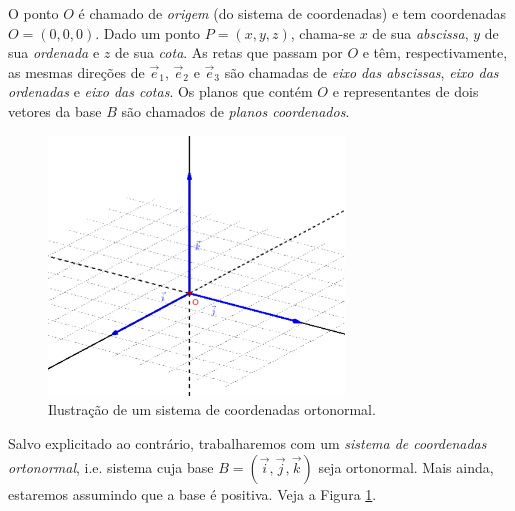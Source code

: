 O ponto $O$ é chamado de \emph{origem} (do sistema de coordenadas) e tem coordenadas $O=(0,0,0)$. Dado um ponto $P=(x,y,z)$, chama-se $x$ de sua \emph{abscissa}, $y$ de sua \emph{ordenada} e $z$ de sua \emph{cota}. As retas que passam por $O$ e têm, respectivamente, as mesmas direções de $\vec{e}_1$, $\vec{e}_2$ e $\vec{e}_3$ são chamadas de \emph{eixo das abscissas}, \emph{eixo das ordenadas} e \emph{eixo das cotas}. Os planos que contém $O$ e representantes de dois vetores da base $B$ são chamados de \emph{planos coordenados}.

\begin{figure}[H]
  \centering
  \includegraphics[width=0.7\textwidth]{./cap_scoord/dados/fig_sis_coord_orto/fig}
  \caption{Ilustração de um sistema de coordenadas ortonormal.}
  \label{fig:sis_coord_orto}
\end{figure}

Salvo explicitado ao contrário, trabalharemos com um \emph{sistema de coordenadas ortonormal}, i.e. sistema cuja base $B = (\vec{i},\vec{j},\vec{k})$ seja ortonormal. Mais ainda, estaremos assumindo que a base é positiva. Veja a Figura \ref{fig:sis_coord_orto}.


